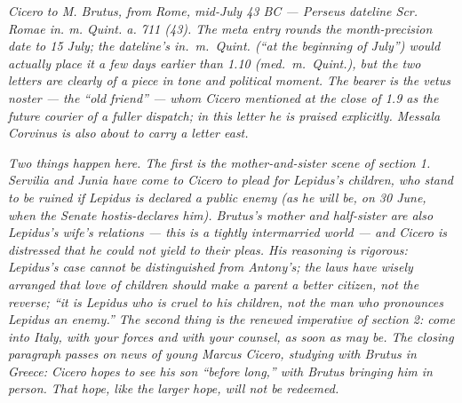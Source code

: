
\textit{Cicero to M. Brutus, from Rome, mid-July 43 BC
--- Perseus dateline \textit{Scr. Romae in. m. Quint.
a. 711 (43)}. The meta entry rounds the month-precision
date to 15 July; the dateline's \textit{in.~m.~Quint.}
(``at the beginning of July'') would actually place it
a few days earlier than 1.10 (\textit{med.~m.~Quint.}),
but the two letters are clearly of a piece in tone and
political moment. The bearer is the \textit{vetus
noster} --- the ``old friend'' --- whom Cicero
mentioned at the close of 1.9 as the future courier of
a fuller dispatch; in this letter he is praised
explicitly. Messala Corvinus is also about to carry a
letter east.}

\textit{Two things happen here. The first is the
mother-and-sister scene of section 1. Servilia and
Junia have come to Cicero to plead for Lepidus's
children, who stand to be ruined if Lepidus is declared
a public enemy (as he will be, on 30 June, when the
Senate hostis-declares him). Brutus's mother and
half-sister are also Lepidus's wife's relations ---
this is a tightly intermarried world --- and Cicero is
distressed that he could not yield to their pleas. His
reasoning is rigorous: Lepidus's case cannot be
distinguished from Antony's; the laws have wisely
arranged that love of children should make a parent a
better citizen, not the reverse; ``it is Lepidus who is
cruel to his children, not the man who pronounces
Lepidus an enemy.'' The second thing is the renewed
imperative of section 2: come into Italy, with your
forces and with your counsel, as soon as may be. The
closing paragraph passes on news of young Marcus
Cicero, studying with Brutus in Greece: Cicero hopes
to see his son ``before long,'' with Brutus bringing
him in person. That hope, like the larger hope, will
not be redeemed.}
